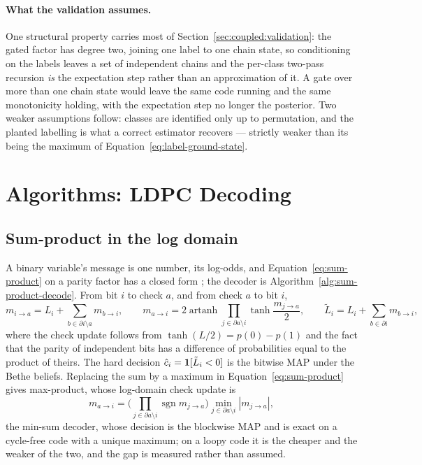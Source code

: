 \documentclass[11pt,a4paper]{article}
\begin{document}
\paragraph{What the validation assumes.}
One structural property carries most of Section~\ref{sec:coupled:validation}:
the gated factor has degree two, joining one label to one chain state, so
conditioning on the labels leaves a set of independent chains and the
per-class two-pass recursion \emph{is} the expectation step rather than an
approximation of it. A gate over more than one chain state would leave the same
code running and the same monotonicity holding, with the expectation step no
longer the posterior. Two weaker assumptions follow: classes are identified
only up to permutation, and the planted labelling is what a correct estimator
recovers --- strictly weaker than its being the maximum of
Equation~\ref{eq:label-ground-state}.

\section{Algorithms: LDPC Decoding}
\label{sec:ldpc:algorithms}

\subsection{Sum-product in the log domain}
A binary variable's message is one number, its log-odds, and
Equation~\ref{eq:sum-product} on a parity factor has a closed form
\citep{gallager1962, mackay2003, richardson2008}; the decoder is
Algorithm~\ref{alg:sum-product-decode}. From bit $i$ to check $a$,
and from check $a$ to bit $i$,
\begin{equation}
  m_{i \to a} = L_i + \sum_{b \in \partial i \setminus a} m_{b \to i},
  \qquad
  m_{a \to i} = 2 \operatorname{artanh}
    \prod_{j \in \partial a \setminus i} \tanh \frac{m_{j \to a}}{2},
  \qquad
  \tilde L_i = L_i + \sum_{b \in \partial i} m_{b \to i},
  \label{eq:tanh-rule}
\end{equation}
where the check update follows from $\tanh(L/2) = p(0) - p(1)$ and the fact
that the parity of independent bits has a difference of probabilities equal
to the product of theirs. The hard decision $\hat c_i = \mathbf{1}[\tilde L_i
< 0]$ is the bitwise MAP under the Bethe beliefs. Replacing the sum by a
maximum in Equation~\ref{eq:sum-product} gives max-product, whose log-domain
check update is
\begin{equation}
  m_{a \to i} = \Big( \prod_{j \in \partial a \setminus i} \operatorname{sgn} m_{j \to a} \Big)
                \min_{j \in \partial a \setminus i} |m_{j \to a}|,
  \label{eq:min-sum}
\end{equation}
the min-sum decoder, whose decision is the blockwise MAP and is exact on a
cycle-free code with a unique maximum; on a loopy code it is the cheaper
and the weaker of the two, and the gap is measured rather than assumed.
\end{document}

